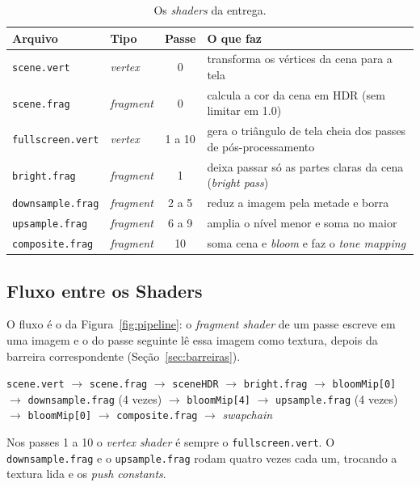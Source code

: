 \begin{table}[htb]
    \centering
    \caption{Os \textit{shaders} da entrega.}
    \label{tab:shaders}
    \vspace{4pt}
    \small
    \begin{tabular}{l l c p{7.2cm}}
        \toprule
        \textbf{Arquivo} & \textbf{Tipo} & \textbf{Passe} & \textbf{O que faz} \\
        \midrule
        \texttt{scene.vert} & \textit{vertex} & 0 & transforma os vértices da cena para a tela \\
        \texttt{scene.frag} & \textit{fragment} & 0 & calcula a cor da cena em HDR (sem limitar em 1.0) \\
        \texttt{fullscreen.vert} & \textit{vertex} & 1 a 10 & gera o triângulo de tela cheia dos passes de pós-processamento \\
        \texttt{bright.frag} & \textit{fragment} & 1 & deixa passar só as partes claras da cena (\textit{bright pass}) \\
        \texttt{downsample.frag} & \textit{fragment} & 2 a 5 & reduz a imagem pela metade e borra \\
        \texttt{upsample.frag} & \textit{fragment} & 6 a 9 & amplia o nível menor e soma no maior \\
        \texttt{composite.frag} & \textit{fragment} & 10 & soma cena e \textit{bloom} e faz o \textit{tone mapping} \\
        \bottomrule
    \end{tabular}
\end{table}

\subsection{Fluxo entre os Shaders}
O fluxo é o da Figura~\ref{fig:pipeline}: o \textit{fragment shader} de um passe escreve em uma imagem e o do passe seguinte lê essa imagem como textura, depois da barreira correspondente (Seção~\ref{sec:barreiras}).
\begin{center}
    \texttt{scene.vert} $\to$ \texttt{scene.frag} $\to$ \texttt{sceneHDR} $\to$ \texttt{bright.frag} $\to$ \texttt{bloomMip[0]} $\to$ \texttt{downsample.frag} (4 vezes) $\to$ \texttt{bloomMip[4]} $\to$ \texttt{upsample.frag} (4 vezes) $\to$ \texttt{bloomMip[0]} $\to$ \texttt{composite.frag} $\to$ \textit{swapchain}
\end{center}
Nos passes 1 a 10 o \textit{vertex shader} é sempre o \texttt{fullscreen.vert}. O \texttt{downsample.frag} e o \texttt{upsample.frag} rodam quatro vezes cada um, trocando a textura lida e os \textit{push constants}.

